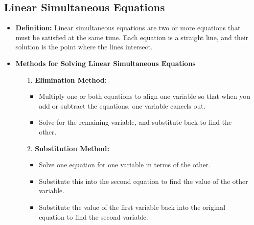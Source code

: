 
\subsection{Linear Simultaneous Equations}
\begin{itemize}
    \item \textbf{Definition:} Linear simultaneous equations are two or more equations that must be satisfied at the same time.
    Each equation is a straight line, and their solution is the point where the lines intersect.
    \item \textbf{Methods for Solving Linear Simultaneous Equations}
    \begin{itemize}
        \item[1.] \textbf{Elimination Method:}
        \begin{itemize}
            \item Multiply one or both equations to align one variable so that when you add or subtract the equations, one
            variable cancels out.
            \item Solve for the remaining variable, and substitute back to find the other.
        \end{itemize}
        \item[2.] \textbf{Substitution Method:}
        \begin{itemize}
            \item Solve one equation for one variable in terms of the other.
            \item Substitute this into the second equation to find the value of the other variable.
            \item Substitute the value of the first variable back into the original equation to find the second variable.
        \end{itemize}
    \end{itemize}
\end{itemize}